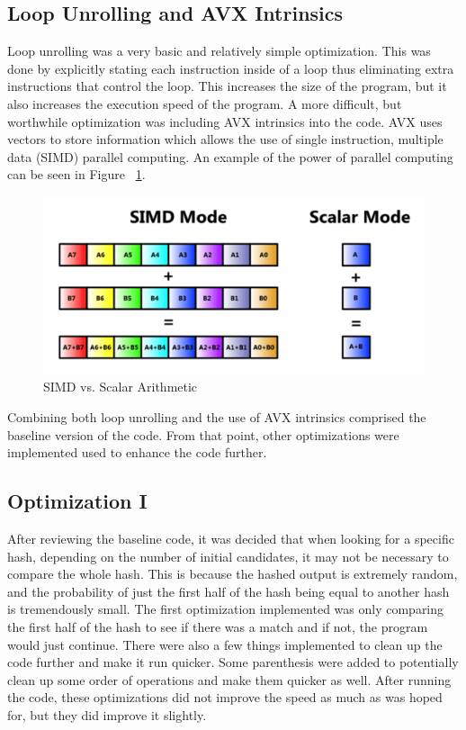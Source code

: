 \documentclass[journal]{IEEEtran}
\begin{document}
\subsection{Loop Unrolling and AVX Intrinsics}
Loop unrolling was a very basic and relatively simple optimization. This was done by explicitly stating each instruction inside of a loop thus eliminating extra instructions that control the loop. This increases the size of the program, but it also increases the execution speed of the program.
\newline
A more difficult, but worthwhile optimization was including AVX intrinsics into the code. AVX uses vectors to store information which allows the use of single instruction, multiple data (SIMD) parallel computing. An example of the power of parallel computing can be seen in Figure ~\ref{SIMD}.

\begin{figure}[H]
	\centering
	\includegraphics[scale=.30]{SIMD.png}
	\caption{SIMD vs. Scalar Arithmetic \cite{SIMD}}
	\label{SIMD}
\end{figure}

Combining both loop unrolling and the use of AVX intrinsics comprised the baseline version of the code. From that point, other optimizations were implemented used to enhance the code further. 

\subsection{Optimization I}
After reviewing the baseline code, it was decided that when looking for a specific hash, depending on the number of initial candidates, it may not be necessary to compare the whole hash. This is because the hashed output is extremely random, and the probability of just the first half of the hash being equal to another hash is tremendously small. The first optimization implemented was only comparing the first half of the hash to see if there was a match and if not, the program would just continue. There were also a few things implemented to clean up the code further and make it run quicker. Some parenthesis were added to potentially clean up some order of operations and make them quicker as well. After running the code, these optimizations did not improve the speed as much as was hoped for, but they did improve it slightly.
\end{document}
